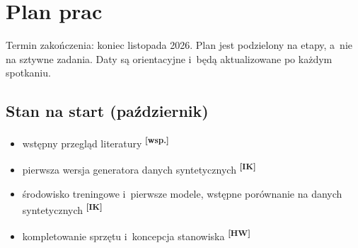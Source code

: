 \documentclass[11pt,a4paper]{article}
\newcommand{\IK}{\textsuperscript{\textbf{[IK]}}}
\newcommand{\HW}{\textsuperscript{\textbf{[HW]}}}
\newcommand{\WS}{\textsuperscript{\textbf{[wsp.]}}}
\begin{document}
\section*{Plan prac}

Termin zakończenia: koniec listopada 2026. Plan jest podzielony na etapy, a~nie
na sztywne zadania. Daty są orientacyjne i~będą aktualizowane po każdym spotkaniu.

\subsection*{Stan na start (październik)}
\begin{itemize}
  \item wstępny przegląd literatury \WS
  \item pierwsza wersja generatora danych syntetycznych \IK
  \item środowisko treningowe i~pierwsze modele, wstępne porównanie na danych syntetycznych \IK
  \item kompletowanie sprzętu i~koncepcja stanowiska \HW
\end{itemize}
\end{document}
